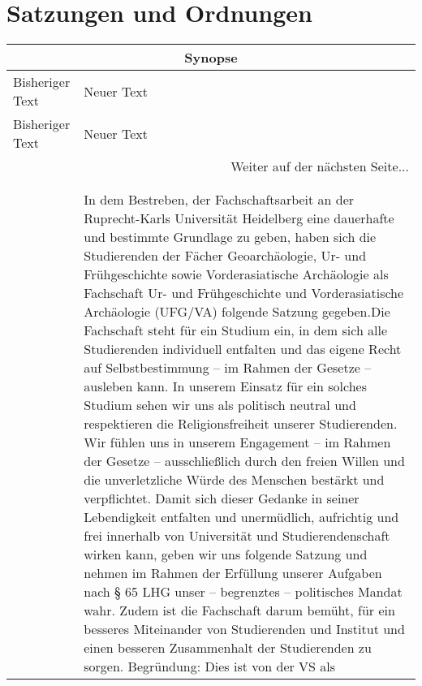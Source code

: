 \section{Satzungen und Ordnungen}

    {\begin{longtable}{|p{7.5cm}|p{7.5cm}|}
        \hline
        \multicolumn{2}{|c|}{Synopse}\\\hline
        Bisheriger Text & Neuer Text \\\hline
        \endfirsthead
        \hline
        Bisheriger Text & Neuer Text \\
        \hline
        \endhead
        \hline
        \multicolumn{2}{|r|}{Weiter auf der nächsten Seite...}\\
        \hline
        \endfoot
        \hline
        \multicolumn{2}{c}{Ende der Synopse} \\
        \endlastfoot
        \multicolumn{2}{|c|}{Präambel}\\\hline
        & 
        In dem Bestreben, der Fachschaftsarbeit an der Ruprecht-Karls Universität Heidelberg
        eine dauerhafte und bestimmte Grundlage zu geben, haben sich die Studierenden der
        Fächer Geoarchäologie, Ur- und Frühgeschichte sowie Vorderasiatische Archäologie als
        Fachschaft Ur- und Frühgeschichte und Vorderasiatische Archäologie (UFG/VA) folgende
        Satzung gegeben.\newline Die Fachschaft steht für ein Studium ein, in dem sich alle Studierenden individuell
        entfalten und das eigene Recht auf Selbstbestimmung – im Rahmen der Gesetze –
        ausleben kann. In unserem Einsatz für ein solches Studium sehen wir uns als politisch
        neutral und respektieren die Religionsfreiheit unserer Studierenden. Wir fühlen uns
        in unserem Engagement – im Rahmen der Gesetze – ausschließlich durch den freien
        Willen und die unverletzliche Würde des Menschen bestärkt und verpflichtet. Damit
        sich dieser Gedanke in seiner Lebendigkeit entfalten und unermüdlich, aufrichtig und
        frei innerhalb von Universität und Studierendenschaft wirken kann, geben wir uns
        folgende Satzung und nehmen im Rahmen der Erfüllung unserer Aufgaben nach § 65 LHG
        unser – begrenztes – politisches Mandat wahr. Zudem ist die Fachschaft darum bemüht,
        für ein besseres Miteinander von Studierenden und Institut und einen besseren
        Zusammenhalt der Studierenden zu sorgen. Begründung: Dies ist von der VS als

\end{longtable}}
